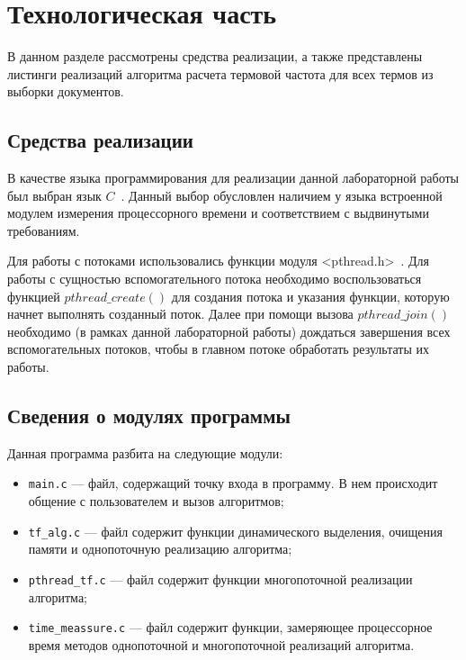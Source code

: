 \chapter{Технологическая часть}

В данном разделе рассмотрены средства реализации, а также представлены листинги реализаций алгоритма расчета термовой частота для всех термов из выборки документов.

\section{Средства реализации}

В качестве языка программирования для реализации данной лабораторной работы был выбран язык $C$~\cite{c-lang}. Данный выбор обусловлен наличием у языка встроенной модулем измерения процессорного времени и соответствием с выдвинутыми  требованиям.

Для работы с потоками использовались функции модуля <pthread.h>~\cite{c-thread}. Для работы с сущностью вспомогательного потока необходимо воспользоваться функцией $pthread\_create()$ для создания потока и указания функции, которую начнет выполнять созданный поток. Далее при помощи вызова $pthread\_join()$ необходимо (в рамках данной лабораторной работы) дождаться завершения всех вспомогательных потоков, чтобы в главном потоке обработать результаты их работы.

\clearpage

\section{Сведения о модулях программы}

Данная программа разбита на следующие модули:

\begin{itemize}[label=---]
	\item \texttt{main.c} --- файл, содержащий точку входа в программу. В нем происходит общение с пользователем и вызов алгоритмов;
	\item \texttt{tf\_alg.c} --- файл содержит функции динамического выделения, очищения памяти и однопоточную реализацию алгоритма;
	\item \texttt{pthread\_tf.c} --- файл содержит функции многопоточной реализации алгоритма;
	\item \texttt{time\_meassure.c} --- файл содержит функции, замеряющее процессорное время методов однопоточной и многопоточной реализаций алгоритма.
\end{itemize}

